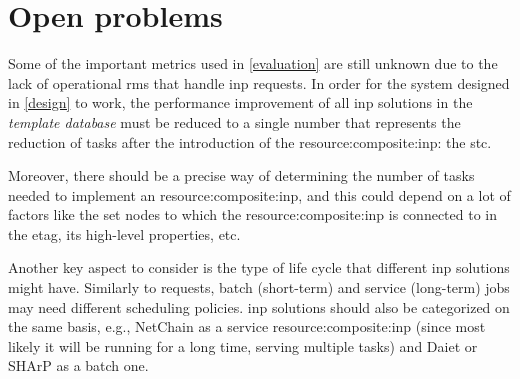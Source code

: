 \section{Open problems}
Some of the important metrics used in \autoref{evaluation} are still unknown due to the lack of operational \glspl{rm} that handle \gls{inp} requests.
In order for the system designed in \autoref{design} to work, the performance improvement of all \gls{inp} solutions in the \textit{template database} must be reduced to a single number that represents the reduction of  tasks after the introduction of the \gls{resource:composite:inp}: the \gls{stc}.

Moreover, there should be a precise way of determining the number of  tasks needed to implement an \gls{resource:composite:inp}, and this could depend on a lot of factors like the set nodes to which the \gls{resource:composite:inp} is connected to in the \gls{etag}, its high-level properties, etc.

Another key aspect to consider is the type of life cycle that different \gls{inp} solutions might have.
Similarly to  requests, batch (short-term) and service (long-term) jobs may need different scheduling policies.
\gls{inp} solutions should also be categorized on the same basis, e.g., NetChain \cite{netchain} as a service \gls{resource:composite:inp} (since most likely it will be running for a long time, serving multiple  tasks) and Daiet \cite{daiet} or SHArP \cite{sharp} as a batch one.